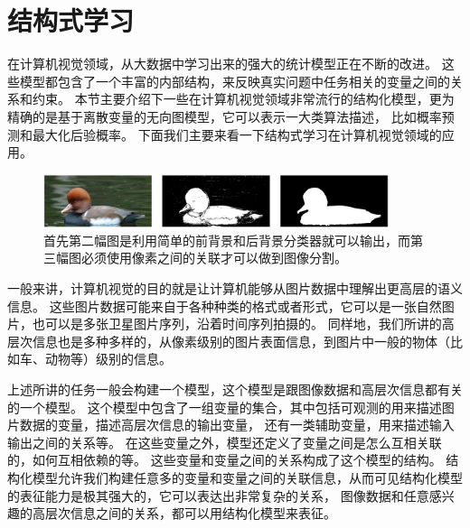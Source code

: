 \section{结构式学习}
在计算机视觉领域，从大数据中学习出来的强大的统计模型正在不断的改进。
这些模型都包含了一个丰富的内部结构，来反映真实问题中任务相关的变量之间的关系和约束。
本节主要介绍下一些在计算机视觉领域非常流行的结构化模型，更为精确的是基于离散变量的无向图模型，它可以表示一大类算法描述，
比如概率预测和最大化后验概率。
下面我们主要来看一下结构式学习在计算机视觉领域的应用。

\begin{figure}
\centering
\includegraphics[width=0.9\textwidth]{img/struct.jpg}
\caption{首先第二幅图是利用简单的前背景和后背景分类器就可以输出，而第三幅图必须使用像素之间的关联才可以做到图像分割。}
\label{fig:struct}
\end{figure}



一般来讲，计算机视觉的目的就是让计算机能够从图片数据中理解出更高层的语义信息。
这些图片数据可能来自于各种种类的格式或者形式，它可以是一张自然图片，也可以是多张卫星图片序列，沿着时间序列拍摄的。
同样地，我们所讲的高层次信息也是多种多样的，从像素级别的图片表面信息，到图片中一般的物体（比如车、动物等）级别的信息。

上述所讲的任务一般会构建一个模型，这个模型是跟图像数据和高层次信息都有关的一个模型。
这个模型中包含了一组变量的集合，其中包括可观测的用来描述图片数据的变量，描述高层次信息的输出变量，
还有一类辅助变量，用来描述输入输出之间的关系等。
在这些变量之外，模型还定义了变量之间是怎么互相关联的，如何互相依赖的等。
这些变量和变量之间的关系构成了这个模型的结构。
结构化模型允许我们构建任意多的变量和变量之间的关联信息，从而可见结构化模型的表征能力是极其强大的，它可以表达出非常复杂的关系，
图像数据和任意感兴趣的高层次信息之间的关系，都可以用结构化模型来表征。

